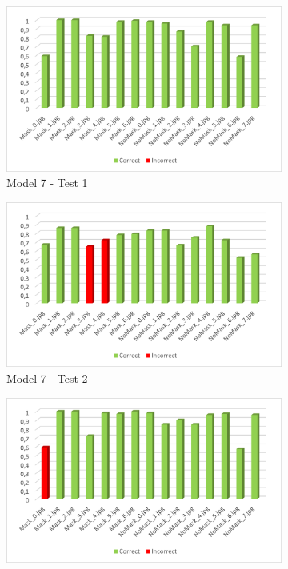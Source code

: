 \documentclass[a4paper,12pt]{article}
\begin{document}
\begin{figure}%
    \centering
    \begin{subfigure}{6cm}
        \includegraphics[width=\linewidth]{images_latex/test7_1.png}
        \caption{Model 7 - Test 1}
    \end{subfigure}
    \qquad
    \begin{subfigure}{6cm}
        \includegraphics[width=\linewidth]{images_latex/test7_2.png}
        \caption{ Model 7 - Test 2}
    \end{subfigure}
    \qquad
    \begin{subfigure}{6cm}
        \includegraphics[width=\linewidth]{images_latex/test7_3.png}

\end{subfigure}
\end{figure}
\end{document}
